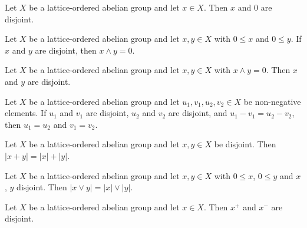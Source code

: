 \begin{lemma}
\label{lem:isVLDisjoint-zero-right}
\leanok
{}
Let $X$ be a lattice-ordered abelian group and let $x \in X$. Then $x$
and $0$ are disjoint.
\end{lemma}

\begin{lemma}
\label{lem:inf-eq-zero-of-isVLDisjoint}
\leanok
{}
Let $X$ be a lattice-ordered abelian group and let $x, y \in X$ with
$0 \le x$ and $0 \le y$. If $x$ and $y$ are disjoint, then $x \wedge y
= 0$.
\end{lemma}

\begin{lemma}
\label{lem:isVLDisjoint-of-inf-eq-zero}
\leanok
{}
Let $X$ be a lattice-ordered abelian group and let $x, y \in X$ with
$x \wedge y = 0$. Then $x$ and $y$ are disjoint.
\end{lemma}

\begin{theorem}
\label{thm:isVLDisjoint-decomposition-unique}
\leanok
{}
Let $X$ be a lattice-ordered abelian group and let $u_1, v_1, u_2, v_2
\in X$ be non-negative elements. If $u_1$ and $v_1$ are disjoint, $u_2$
and $v_2$ are disjoint, and $u_1 - v_1 = u_2 - v_2$, then $u_1 = u_2$
and $v_1 = v_2$.
\end{theorem}

\begin{theorem}
\label{thm:abs-add-of-isVLDisjoint}
\leanok
{}
Let $X$ be a lattice-ordered abelian group and let $x, y \in X$ be
disjoint. Then $\lvert x + y \rvert = \lvert x \rvert + \lvert y \rvert$.
\end{theorem}

\begin{lemma}
\label{lem:abs-sup-of-isVLDisjoint}
\leanok
{}
Let $X$ be a lattice-ordered abelian group and let $x, y \in X$ with
$0 \le x$, $0 \le y$ and $x$, $y$ disjoint. Then $\lvert x \vee y
\rvert = \lvert x \rvert \vee \lvert y \rvert$.
\end{lemma}

\begin{lemma}
\label{lem:isVLDisjoint-posPart-negPart}
\leanok
{}
Let $X$ be a lattice-ordered abelian group and let $x \in X$. Then
$x^+$ and $x^-$ are disjoint.
\end{lemma}

